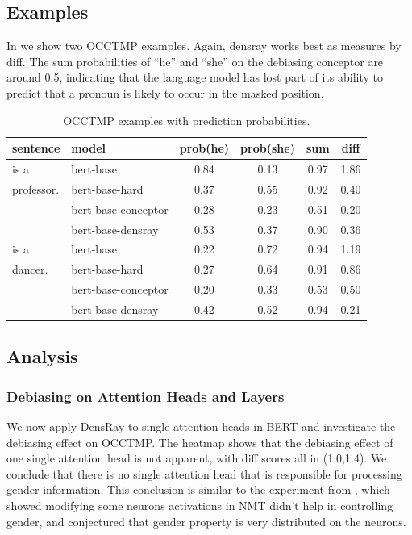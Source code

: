\subsection{Examples}
In  we show two OCCTMP examples.
Again, densray works best as measures by diff.
The sum probabilities of ``he'' and ``she''
on the debiasing conceptor are around 0.5, indicating that
the language model has lost part of its ability to predict that 
a pronoun is  likely to occur in the masked position.
\begin{table}[h]
	\centering
	\footnotesize
		\vspace{0cm}  
	\setlength{\abovecaptionskip}{0.2cm}   
	\setlength{\belowcaptionskip}{0cm}  
	\begin{tabular}{llcccc}
		\hline
		sentence & model & prob(he) & prob(she) &sum&diff\\
		\hline
		[MASK] is a & bert-base & 0.84 & 0.13&0.97&1.86\\
		professor.& bert-base-hard& 0.37 & 0.55&0.92&0.40\\
		& bert-base-conceptor& 0.28 & 0.23&0.51&{0.20}\\
		& bert-base-densray & 0.53 & 0.37&0.90&0.36\\
		\hline
		[MASK] is a & bert-base & 0.22 & 0.72&0.94&1.19\\
		dancer.  & bert-base-hard& 0.27 & 0.64&0.91&0.86\\
		& bert-base-conceptor& 0.20 & 0.33&0.53&0.50\\
		& bert-base-densray& 0.42 & 0.52&0.94&0.21\\
		\hline
	\end{tabular}
	\caption{
		OCCTMP examples with prediction probabilities.}
\end{table}

\subsection{Analysis}

\subsubsection*{Debiasing on Attention Heads and Layers}
We now apply DensRay to single attention heads in BERT and investigate the debiasing effect on OCCTMP. The heatmap  shows that the debiasing effect of one single attention head is not apparent, with diff scores all in (1.0,1.4). We conclude that there is no single attention head that is responsible for processing gender information.
This conclusion is similar to the experiment from , which showed modifying some neurons activations in NMT didn't help in controlling gender, and conjectured that gender property is very distributed on the neurons.

